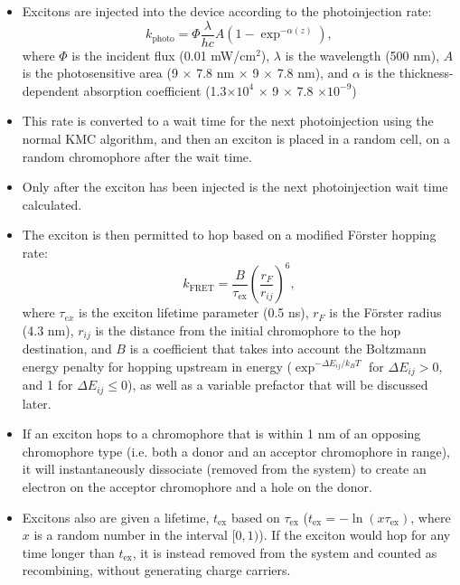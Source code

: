 \documentclass[12pt]{article}
\begin{document}
\begin{itemize}
    \item{Excitons are injected into the device according to the photoinjection rate:
    \begin{equation}
        k_{\text{photo}} = \Phi \frac{\lambda}{hc} A \left( 1 - \exp^{- \alpha(z)} \right),
    \end{equation}
    where $\Phi$ is the incident flux (0.01 mW/cm$^{2}$), $\lambda$ is the wavelength (500 nm), $A$ is the photosensitive area (9 $\times$ 7.8 nm $\times$ 9 $\times$ 7.8 nm), and $\alpha$ is the thickness-dependent absorption coefficient (1.3$\times 10^4$ $\times$ 9 $\times$ 7.8 $\times 10^{-9}$)}
    \item{This rate is converted to a wait time for the next photoinjection using the normal KMC algorithm, and then an exciton is placed in a random cell, on a random chromophore after the wait time.}
    \item{Only after the exciton has been injected is the next photoinjection wait time calculated.}
    \item{The exciton is then permitted to hop based on a modified F\"orster hopping rate:
    \begin{equation}
        k_{\text{FRET}} = \frac{B}{\tau_{\text{ex}}} \left( \frac{r_{F}}{r_{ij}} \right)^{6}, 
    \end{equation}
where $\tau_{ex}$ is the exciton lifetime parameter (0.5 ns), $r_{F}$ is the F\"orster radius (4.3 nm), $r_{ij}$ is the distance from the initial chromophore to the hop destination, and $B$ is a coefficient that takes into account the Boltzmann energy penalty for hopping upstream in energy ($\exp^{- \Delta E_{ij} / k_{B} T}$ for $\Delta E_{ij} > 0$, and 1 for $\Delta E_{ij} \leq 0$), as well as a variable prefactor that will be discussed later.}
    \item{If an exciton hops to a chromophore that is within 1 nm of an opposing chromophore type (i.e. both a donor and an acceptor chromophore in range), it will instantaneously dissociate (removed from the system) to create an electron on the acceptor chromophore and a hole on the donor.}
    \item{Excitons also are given a lifetime, $t_{\text{ex}}$ based on $\tau_{\text{ex}}$ ($t_{\text{ex}} = - \ln (x \tau_{\text{ex}})$, where $x$ is a random number in the interval $[0,1)$). If the exciton would hop for any time longer than $t_{\text{ex}}$, it is instead removed from the system and counted as recombining, without generating charge carriers.}
\end{itemize}
\end{document}
